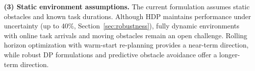 \documentclass[manuscript,screen,review]{acmart}
\begin{document}
\textbf{(3) Static environment assumptions.}
The current formulation assumes static obstacles and known task durations.
Although HDP maintains performance under uncertainty (up to 40\%, Section~\ref{sec:robustness}), fully dynamic
environments with online task arrivals and moving obstacles remain an open
challenge. Rolling horizon optimization with warm-start re-planning provides
a near-term direction, while robust DP formulations and predictive obstacle
avoidance offer a longer-term direction.







\appendix
\end{document}
